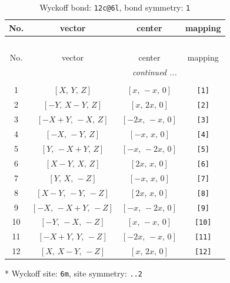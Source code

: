 \documentclass[fleqn,8pt]{jsarticle}
\begin{document}
\begin{longtable}{cccc}
\caption{Wyckoff bond: {\tt 12c@6l}, bond symmetry: {\tt 1}}
 \\
 \hline \hline
No. & vector & center & mapping \\ \hline \endfirsthead

\multicolumn{3}{l}{\tablename\ \thetable{}} \\
 \hline \hline
No. & vector & center & mapping \\ \hline \endhead

 \hline \hline
\multicolumn{3}{r}{\footnotesize\it continued ...} \\ \endfoot

 \hline \hline
\multicolumn{3}{r}{} \\ \endlastfoot

1 & $\left[ X,\, Y,\, Z \right]$ & $\left[ x,\, - x,\, 0 \right]$ & {\tt [1]} \\ \hline
2 & $\left[ - Y,\, X - Y,\, Z \right]$ & $\left[ x,\, 2 x,\, 0 \right]$ & {\tt [2]} \\ \hline
3 & $\left[ - X + Y,\, - X,\, Z \right]$ & $\left[ - 2 x,\, - x,\, 0 \right]$ & {\tt [3]} \\ \hline
4 & $\left[ - X,\, - Y,\, Z \right]$ & $\left[ - x,\, x,\, 0 \right]$ & {\tt [4]} \\ \hline
5 & $\left[ Y,\, - X + Y,\, Z \right]$ & $\left[ - x,\, - 2 x,\, 0 \right]$ & {\tt [5]} \\ \hline
6 & $\left[ X - Y,\, X,\, Z \right]$ & $\left[ 2 x,\, x,\, 0 \right]$ & {\tt [6]} \\ \hline
7 & $\left[ Y,\, X,\, - Z \right]$ & $\left[ - x,\, x,\, 0 \right]$ & {\tt [7]} \\ \hline
8 & $\left[ X - Y,\, - Y,\, - Z \right]$ & $\left[ 2 x,\, x,\, 0 \right]$ & {\tt [8]} \\ \hline
9 & $\left[ - X,\, - X + Y,\, - Z \right]$ & $\left[ - x,\, - 2 x,\, 0 \right]$ & {\tt [9]} \\ \hline
10 & $\left[ - Y,\, - X,\, - Z \right]$ & $\left[ x,\, - x,\, 0 \right]$ & {\tt [10]} \\ \hline
11 & $\left[ - X + Y,\, Y,\, - Z \right]$ & $\left[ - 2 x,\, - x,\, 0 \right]$ & {\tt [11]} \\ \hline
12 & $\left[ X,\, X - Y,\, - Z \right]$ & $\left[ x,\, 2 x,\, 0 \right]$ & {\tt [12]} \\
\end{longtable}
* Wyckoff site: {\tt 6m}, site symmetry: {\tt ..2}
\renewcommand{\arraystretch}{1.2}
\end{document}
